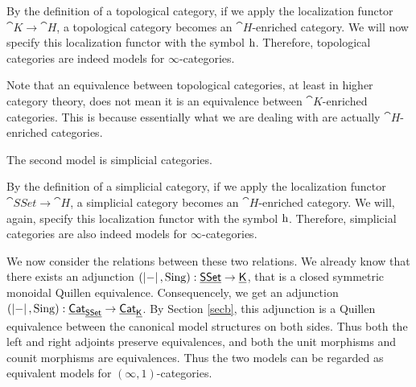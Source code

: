 By the definition of a topological category, if we apply the localization functor $\cat K\to\cat H$, a topological category becomes an
$\cat{H}$-enriched category. We will now specify this localization functor with the symbol $\mathrm{h}$. Therefore, topological categories are indeed
models for $\infty$-categories. 


Note that an equivalence between topological categories, at least in higher category theory, does not mean it is an equivalence
between $\cat K$-enriched categories. This is because essentially what we are dealing with are actually $\cat{H}$-enriched categories.

The second model is simplicial categories.


By the definition of a simplicial category, if we apply the localization functor $\cat{SSet}\to\cat H$, a simplicial category becomes an
$\cat{H}$-enriched category. We will, again, specify this localization functor with the symbol $\mathrm{h}$. Therefore, simplicial categories
are also indeed models for $\infty$-categories. 


We now consider the relations between these two relations. We already know that there exists an adjunction $(\left|-\right|,\operatorname{Sing}):\underline{\smash{\mathsf{SSet}}}\to\underline{\smash{\mathsf{K}}}$,
that is a closed symmetric monoidal Quillen equivalence. Consequencely, we get an adjunction 
$(\left|-\right|,\operatorname{Sing}):\underline{\smash{\mathsf{Cat}}}_{\underline{\smash{\mathsf{SSet}}}}\to\underline{\smash{\mathsf{Cat}}}_{\underline{\smash{\mathsf{K}}}}$. By Section \ref{secb}, this adjunction is a Quillen equivalence between the
canonical model structures on both sides. Thus both the left and right adjoints preserve equivalences, and both the unit morphisms 
and counit morphisms are equivalences. Thus the two models can be regarded as equivalent models for $(\infty,1)$-categories.

